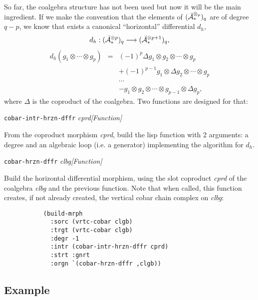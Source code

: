 So far, the coalgebra structure has not been used 
but now it will be the main ingredient.
If we  make the convention that the elements of 
$({\bar{\cal A}}_*^{\otimes_p})_q$ are of degree $q-p$, 
we know that exists a canonical ``horizontal''  differential $d_h$,
$$d_h:({\bar{\cal A}}_*^{\otimes p})_q \longrightarrow ({\bar{\cal A}}_*^{\otimes {p+1}})_q,$$
\begin{eqnarray*}
d_h( g_1 \otimes \cdots \otimes g_p)& = & (-1)^p \Delta g_1 \otimes g_2 \otimes  \cdots \otimes g_p \\
                    & & + (-1)^{p-1} g_1 \otimes \Delta g_2 \otimes \cdots \otimes g_p \\
                    & & \cdots  \\
                    & & - g_1 \otimes g_2 \otimes \cdots \otimes g_{p-1} \otimes \Delta g_p,
\end{eqnarray*}
where $\Delta$ is the coproduct of the coalgebra. Two functions are designed for that:
\vskip 0.45cm
{\parindent=0mm
{\leftskip=5mm 
{\tt cobar-intr-hrzn-dffr} {\em cprd}\hfill {\em [Function]} \par}
{\leftskip=15mm 
From the coproduct morphism {\em cprd}, build the lisp function with 2 arguments:
a degree and an algebraic loop (i.e. a generator) implementing the algorithm for $d_h$. \par}
{\leftskip=5mm 
{\tt cobar-hrzn-dffr} {\em clbg}\hfill {\em [Function]} \par}
{\leftskip=15mm 
Build the horizontal differential morphism, using the slot co\-pro\-duct {\em cprd} of
the coalgebra {\em clbg} and the previous function. 
Note that when called, this function creates, if not already created,
the vertical cobar chain complex on {\em clbg}:
{\footnotesize\begin{verbatim}
           (build-mrph
             :sorc (vrtc-cobar clgb) 
             :trgt (vrtc-cobar clgb) 
             :degr -1
             :intr (cobar-intr-hrzn-dffr cprd) 
             :strt :gnrt
             :orgn `(cobar-hrzn-dffr ,clgb))
\end{verbatim}}
\par}}

\subsection* {Example}

